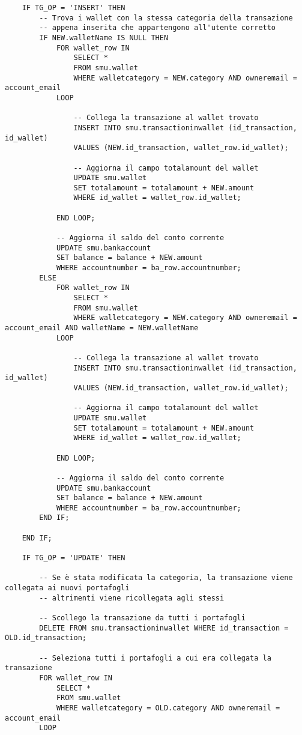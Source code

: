 \begin{lstlisting}
    IF TG_OP = 'INSERT' THEN
        -- Trova i wallet con la stessa categoria della transazione
        -- appena inserita che appartengono all'utente corretto
		IF NEW.walletName IS NULL THEN
			FOR wallet_row IN
				SELECT *
				FROM smu.wallet
				WHERE walletcategory = NEW.category AND owneremail = account_email
			LOOP

				-- Collega la transazione al wallet trovato
				INSERT INTO smu.transactioninwallet (id_transaction, id_wallet)
				VALUES (NEW.id_transaction, wallet_row.id_wallet);

				-- Aggiorna il campo totalamount del wallet
				UPDATE smu.wallet
				SET totalamount = totalamount + NEW.amount
				WHERE id_wallet = wallet_row.id_wallet;

			END LOOP;

			-- Aggiorna il saldo del conto corrente
			UPDATE smu.bankaccount
			SET balance = balance + NEW.amount
			WHERE accountnumber = ba_row.accountnumber;
		ELSE
			FOR wallet_row IN
				SELECT *
				FROM smu.wallet
				WHERE walletcategory = NEW.category AND owneremail = account_email AND walletName = NEW.walletName
			LOOP

				-- Collega la transazione al wallet trovato
				INSERT INTO smu.transactioninwallet (id_transaction, id_wallet)
				VALUES (NEW.id_transaction, wallet_row.id_wallet);

				-- Aggiorna il campo totalamount del wallet
				UPDATE smu.wallet
				SET totalamount = totalamount + NEW.amount
				WHERE id_wallet = wallet_row.id_wallet;

			END LOOP;

			-- Aggiorna il saldo del conto corrente
			UPDATE smu.bankaccount
			SET balance = balance + NEW.amount
			WHERE accountnumber = ba_row.accountnumber;
		END IF;

    END IF;

    IF TG_OP = 'UPDATE' THEN

        -- Se è stata modificata la categoria, la transazione viene collegata ai nuovi portafogli
        -- altrimenti viene ricollegata agli stessi

        -- Scollego la transazione da tutti i portafogli
        DELETE FROM smu.transactioninwallet WHERE id_transaction = OLD.id_transaction;
        
        -- Seleziona tutti i portafogli a cui era collegata la transazione
        FOR wallet_row IN
            SELECT *
            FROM smu.wallet
            WHERE walletcategory = OLD.category AND owneremail = account_email
        LOOP


\end{lstlisting}
